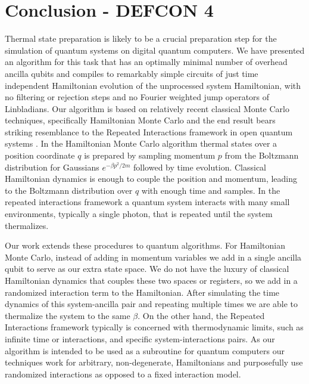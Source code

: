 \documentclass{article}
\begin{document}
\section{Conclusion - DEFCON 4} \label{sec:conclusion}

Thermal state preparation is likely to be a crucial preparation step for the simulation of quantum systems on digital quantum computers. We have presented an algorithm for this task that has an optimally minimal number of overhead ancilla qubits and compiles to remarkably simple circuits of just time independent Hamiltonian evolution of the unprocessed system Hamiltonian, with no filtering or rejection steps and no Fourier weighted jump operators of Linbladians. Our algorithm is based on relatively recent classical Monte Carlo techniques, specifically Hamiltonian Monte Carlo \cite{hoffman2011nouturnsampleradaptivelysetting} and the end result bears striking resemblance to the Repeated Interactions framework in open quantum systems \cite{prositto2025equilibrium}. In the Hamiltonian Monte Carlo algorithm thermal states over a position coordinate $q$ is prepared by sampling momentum $p$ from the Boltzmann distribution for Gaussians $e^{-\beta p^2/2m}$ followed by time evolution. Classical Hamiltonian dynamics is enough to couple the position and momentum, leading to the Boltzmann distribution over $q$ with enough time and samples. In the repeated interactions framework a quantum system interacts with many small environments, typically a single photon, that is repeated until the system thermalizes. 

Our work extends these procedures to quantum algorithms. For Hamiltonian Monte Carlo, instead of adding in momentum variables we add in a single ancilla qubit to serve as our extra state space. We do not have the luxury of classical Hamiltonian dynamics that couples these two spaces or registers, so we add in a randomized interaction term to the Hamiltonian. After simulating the time dynamics of this system-ancilla pair and repeating multiple times we are able to thermalize the system to the same $\beta$. On the other hand, the Repeated Interactions framework typically is concerned with thermodynamic limits, such as infinite time or interactions, and specific system-interactions pairs. As our algorithm is intended to be used as a subroutine for quantum computers our techniques work for arbitrary, non-degenerate, Hamiltonians and purposefully use randomized interactions as opposed to a fixed interaction model.
\end{document}

